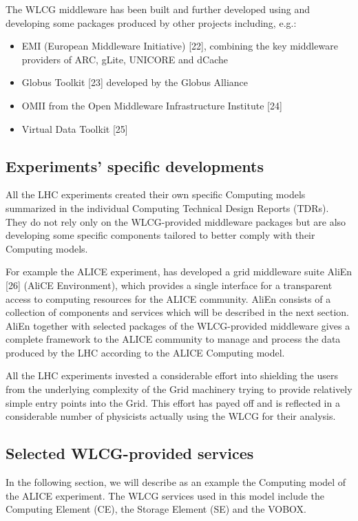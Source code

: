 \documentclass{intech}
\begin{document}
The WLCG middleware has been built and further developed using and
developing some packages produced by other projects including, e.g.:
%
\begin{itemize}
\item EMI (European Middleware Initiative) [22], combining the key
middleware providers of ARC, gLite, UNICORE and dCache
\item Globus Toolkit [23] developed by the Globus Alliance
\item OMII from the Open Middleware Infrastructure Institute [24]
\item Virtual Data Toolkit [25]
\end{itemize}

\subsection{Experiments' specific developments}
%
All the LHC experiments created their own specific Computing models
summarized in the individual Computing Technical Design Reports (TDRs).
They do not rely only on the WLCG-provided middleware packages
but are also developing
some specific components tailored to better comply with their
Computing models.

For example the ALICE experiment, has developed a grid middleware
suite AliEn [26] (AliCE Environment), which provides a single
interface for a transparent access to computing resources for the
ALICE community. AliEn consists of a collection of components and
services which will be described in the next section. AliEn together
with selected packages of the WLCG-provided middleware gives a
complete framework to the ALICE community to manage and process the
data produced by the LHC according to the ALICE Computing model.

All the LHC experiments invested a considerable effort into
shielding the users from the underlying complexity of the Grid
machinery trying to provide relatively simple entry points into the
Grid. This effort has payed off and is reflected in a considerable
number of physicists actually using the WLCG for their analysis.

\subsection{Selected WLCG-provided services}
%
In the following section, we will describe as an example the
Computing model of the ALICE experiment. The WLCG services used in
this model include the Computing Element (CE), the Storage Element
(SE) and the VOBOX.
\end{document}

